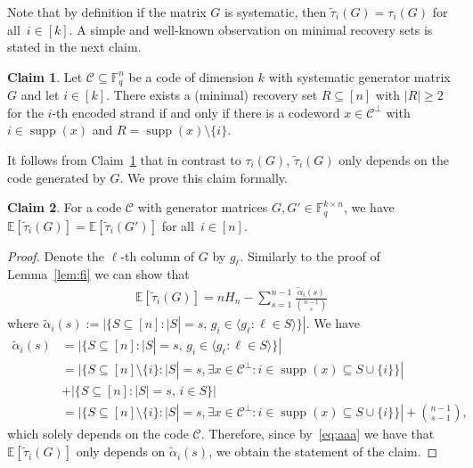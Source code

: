 \documentclass[11pt,a4paper,reqno,twoside]{amsart}
\theoremstyle{definition}
\newcommand{\F}{\mathbb{F}}
\newcommand{\E}{\mathbb{E}}
\newcommand{\mC}{\mathcal{C}}
\newcommand{\supp}{\operatorname{supp}}
\newtheorem{claim}{Claim}
\newcommand{\rcomment}[1]{{\color{red}#1}}
\newcommand{\pcomment}[1]{{\color{purple}#1}}
\newcommand{\vcomment}[1]{{\color{violet}#1}}
\newcommand{\brcomment}[1]{{\color{BrickRed}#1}}
\newcommand{\ag}[1]{{\footnotesize [\brcomment{#1}\;\;\rcomment{--Anina}]}}
\newcommand{\ey}[1]{{{\footnotesize [\pcomment{#1}\;\;\vcomment{--Eitan}]}}}
\begin{document}
Note that by definition if the matrix $G$ is systematic, then $\widetilde{\tau}_i(G) = {\tau}_i(G)$ for all~$i \in [k]$. A simple and well-known observation on minimal recovery sets is stated in the next claim.

\begin{claim} \label{claim:dual}
Let $\mC \subseteq \F_q^n$ be a code of dimension $k$
with systematic generator matrix $G$ and let $i \in [k]$. There exists a (minimal) recovery set $R \subseteq [n]$ with $|R|\ge2$ for the $i$-th encoded strand if and only if there is a codeword $x \in \mC^\perp$ with $i \in \supp(x)$ and $R=\supp(x) \setminus \{i\}$.
\end{claim}

It follows from Claim~\ref{claim:dual} that in contrast to $\tau_i(G)$, $\widetilde{\tau}_i(G)$ only depends on the code
generated by $G$. We prove this claim formally.


\begin{claim}\label{claim_good}
For a code $\mC$ with generator matrices $G,G' \in \F_q^{k \times n}$, we have $\E[\widetilde{\tau}_i(G)]=\E[\widetilde{\tau}_i(G')]$ for all~$i \in [n]$.
\end{claim}
\begin{proof}
Denote the $\ell$-th column of $G$ by $g_{\ell}$. Similarly to the proof of Lemma~\ref{lem:fi} we can show that
\begin{align} \label{eq:aaa}
    \E[\widetilde{\tau}_i(G)] =  n H_n - \sum_{s=1}^{n-1} \displaystyle \frac{\widetilde{\alpha}_i(s)}{\binom{n-1}{s}}
\end{align}
where $\widetilde{\alpha}_i(s) := {|\{S \subseteq [n] : |S| = s, \, g_i \in \langle g_{\ell} : \ell \in S\rangle \}|}.$
We have
    \begin{align*}
    \widetilde{\alpha}_i(s)&={|\{S \subseteq [n] : |S| = s, \, g_i \in \langle g_{\ell} : \ell \in S\rangle \}|} \\
    &= {|\{S \subseteq [n]\setminus \{ i \} : |S| = s, \exists x \in \mC^\perp : i \in \supp(x) \subseteq S \cup \{i\}\}|} \\&+ {|\{S \subseteq [n] : |S| = s, \, i \in S\}|}  \\
    &= {|\{S \subseteq [n]\setminus \{ i \} : |S| = s, \exists x \in \mC^\perp : i \in \supp(x) \subseteq S \cup \{i\}\}|} + \binom{n-1}{s-1},
\end{align*}
which solely depends on the code $\mC$.
Therefore, since by~\eqref{eq:aaa} we have that $\E[\widetilde{\tau}_i(G)]$ only depends on $\widetilde{\alpha}_i(s)$, we obtain the statement of the claim.%
\end{proof}
\end{document}
